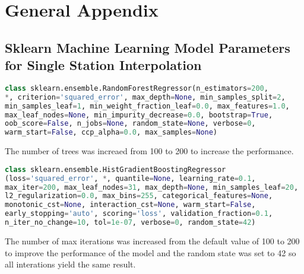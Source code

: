 \chapter{General Appendix}


\section{Sklearn Machine Learning Model Parameters for Single Station Interpolation}
\label{appendix: sklearn ml parameters single station}

\begin{lstlisting}[language=Python, caption=Random Forest Regressor Parameters]
class sklearn.ensemble.RandomForestRegressor(n_estimators=200,
*, criterion='squared_error', max_depth=None, min_samples_split=2,
min_samples_leaf=1, min_weight_fraction_leaf=0.0, max_features=1.0,
max_leaf_nodes=None, min_impurity_decrease=0.0, bootstrap=True,
oob_score=False, n_jobs=None, random_state=None, verbose=0,
warm_start=False, ccp_alpha=0.0, max_samples=None)
\end{lstlisting}

The number of trees was increaed from 100 to 200 to increase the performance.

\begin{lstlisting}[language=Python, caption=Histogram-based Gradient Boosting Parameters]
class sklearn.ensemble.HistGradientBoostingRegressor
(loss='squared_error', *, quantile=None, learning_rate=0.1,
max_iter=200, max_leaf_nodes=31, max_depth=None, min_samples_leaf=20,
l2_regularization=0.0, max_bins=255, categorical_features=None,
monotonic_cst=None, interaction_cst=None, warm_start=False,
early_stopping='auto', scoring='loss', validation_fraction=0.1,
n_iter_no_change=10, tol=1e-07, verbose=0, random_state=42)
\end{lstlisting}

The number of max iterations was increased from the default value of 100 to 200 to improve the performance of the model and the random state was set to 42 so all interations yield the same result.